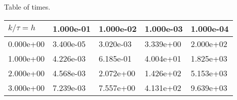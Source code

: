 \begin{center}
Table of times.
  
\begin{tabular}{|p{1in}|p{1in}|p{1in}|p{1in}|p{1in}|} \hline
$k / \tau = h$ &1.000e-01 &1.000e-02 &1.000e-03 &1.000e-04 \\ \hline 
0.000e+00 &3.400e-05 &3.020e-03 &3.339e+00 &2.000e+02 \\ \hline 
1.000e+00 &4.226e-03 &6.185e-01 &4.004e+01 &1.825e+03 \\ \hline 
2.000e+00 &4.568e-03 &2.072e+00 &1.426e+02 &5.153e+03 \\ \hline 
3.000e+00 &7.239e-03 &7.557e+00 &4.131e+02 &9.639e+03 \\ \hline 

\end{tabular}\\[20pt]
\end{center}
